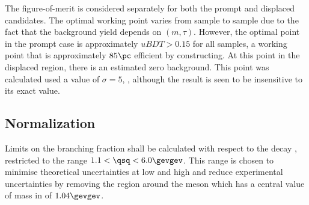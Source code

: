 The figure-of-merit is considered separately for both the prompt and displaced candidates.
The optimal working point varies from sample to sample due to the fact that the background yield
depends on $(m,\tau)$.
However, the optimal point in the prompt case is approximately $uBDT>0.15$ for all samples, a
working point that
is approximately $85\pc$ efficient by constructing.
At this point in the displaced region, there is an estimated zero background.
This point was calculated used a value of $\sigma=5$, , although the result is seen
to be insensitive to its exact value.



\subsection{Normalization}
Limits on the branching fraction shall be calculated with respect to the decay \btokstrmumu,
restricted to the range $1.1<\qsq<6.0\gevgev$.
This range is chosen to minimise theoretical uncertainties at low and high \qsq and reduce
experimental uncertainties by removing the region around the \phii meson which has a central value
of mass in \qsq of \approx$1.04\gevgev$.










